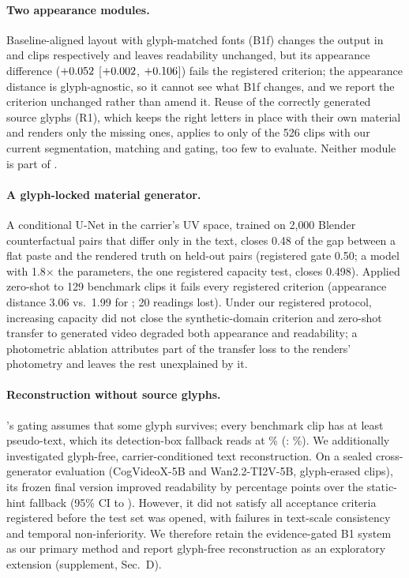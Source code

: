 \paragraph{Two appearance modules.} Baseline-aligned layout with glyph-matched fonts (B1f) changes the output in \rTiltN{} and \rFshapeN{} clips respectively and leaves readability unchanged, but its appearance difference ($+0.052$ [$+0.002$, $+0.106$]) fails the registered criterion; the appearance distance is glyph-agnostic, so it cannot see what B1f changes, and we report the criterion unchanged rather than amend it. Reuse of the correctly generated source glyphs (R1), which keeps the right letters in place with their own material and renders only the missing ones, applies to only \rReuseApplied{} of the 526 clips with our current segmentation, matching and gating, too few to evaluate. Neither module is part of \method.

\paragraph{A glyph-locked material generator.} A conditional U-Net in the carrier's UV space, trained on 2{,}000 Blender counterfactual pairs that differ only in the text, closes 0.48 of the gap between a flat paste and the rendered truth on held-out pairs (registered gate 0.50; a model with 1.8$\times$ the parameters, the one registered capacity test, closes 0.498). Applied zero-shot to 129 benchmark clips it fails every registered criterion (appearance distance 3.06 vs.\ 1.99 for \method; 20 readings lost). Under our registered protocol, increasing capacity did not close the synthetic-domain criterion and zero-shot transfer to generated video degraded both appearance and readability; a photometric ablation attributes part of the transfer loss to the renders' photometry and leaves the rest unexplained by it.

\paragraph{Reconstruction without source glyphs.} \method's gating assumes that some glyph survives; every benchmark clip has at least pseudo-text, which its detection-box fallback reads at \lthreeLtwoBoneRead\% (\steer: \lthreeLtwoSteerRead\%). We additionally investigated glyph-free, carrier-conditioned text reconstruction. On a sealed cross-generator evaluation (CogVideoX-5B and Wan2.2-TI2V-5B, \gTSynN{} glyph-erased clips), its frozen final version improved readability by \gTReadGainU{} percentage points over the static-hint fallback (95\% CI \gTReadGainLo{} to \gTReadGainHi). However, it did not satisfy all acceptance criteria registered before the test set was opened, with failures in text-scale consistency and temporal non-inferiority. We therefore retain the evidence-gated B1 system as our primary method and report glyph-free reconstruction as an exploratory extension (supplement, Sec.~D).

